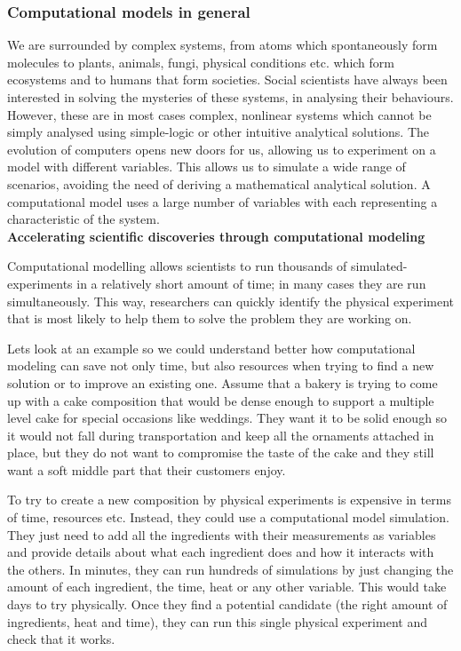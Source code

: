 \documentclass[../main.tex]{subfiles}
\begin{document}
\subsubsection{Computational models in general}
We are surrounded by complex systems, from atoms which spontaneously form molecules to plants, animals, fungi, physical conditions etc. which form ecosystems and to humans that form societies.  Social scientists have always been interested in solving the mysteries of these systems, in analysing their behaviours. However, these are in most cases complex, nonlinear systems which cannot be simply analysed using simple-logic or other intuitive analytical solutions. The evolution of computers opens new doors for us, allowing us to experiment on a model with different variables. This allows us to simulate a wide range of scenarios, avoiding the need of deriving a mathematical analytical solution. A computational model uses a large number of variables with each representing a characteristic of the system. \\

\textbf{Accelerating scientific discoveries through computational modeling}

Computational modelling allows scientists to run thousands of simulated- experiments in a relatively short amount of time; in many cases they are run simultaneously. This way, researchers can quickly identify the physical experiment that is most likely to help them to solve the problem they are working on.

Lets look at an example so we could understand better how computational modeling can save not only time, but also resources when trying to find a new solution or to improve an existing one. Assume that a bakery is trying to come up with a cake composition that would be dense enough to support a multiple level cake for special occasions like weddings. They want it to be solid enough so it would not fall during transportation and keep all the ornaments attached in place, but they do not want to compromise the taste of the cake and they still want a soft middle part that their customers enjoy.

To try to create a new composition by physical experiments is expensive in terms of time, resources etc. Instead, they could use a computational model simulation. They just need to add all the ingredients with their measurements as variables and provide details about what each ingredient does and how it interacts with the others. In minutes, they can run hundreds of simulations by just changing the amount of each ingredient, the time, heat or any other variable. This would take days to try physically. Once they find a potential candidate (the right amount of ingredients, heat and time), they can run this single physical experiment and check that it works.\\
\end{document}
